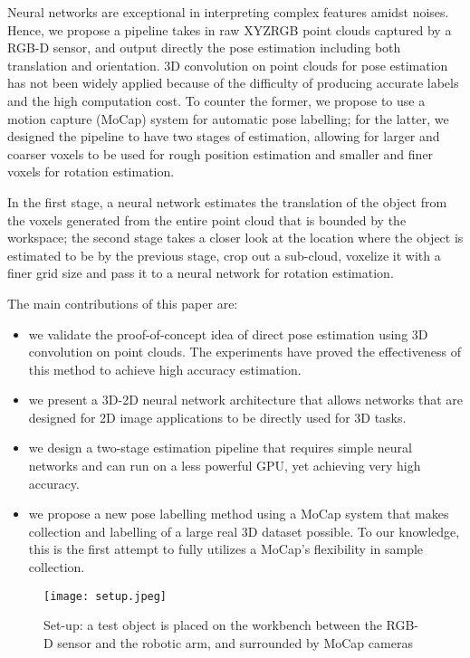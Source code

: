 \documentclass[conference]{IEEEtran}
\begin{document}
Neural networks are exceptional in interpreting complex features amidst noises. Hence, we propose a pipeline takes in raw XYZRGB point clouds captured by a RGB-D sensor, and output directly the pose estimation including both translation and orientation. 3D convolution on point clouds for pose estimation has not been widely applied because of the difficulty of producing accurate labels and the high computation cost. To counter the former, we propose to use a motion capture (MoCap) system for automatic pose labelling; for the latter, we designed the pipeline to have two stages of estimation, allowing for larger and coarser voxels to be used for rough position estimation and smaller and finer voxels for rotation estimation.

In the first stage, a neural network estimates the translation of the object from the voxels generated from the entire point cloud that is bounded by the workspace; the second stage takes a closer look at the location where the object is estimated to be by the previous stage, crop out a sub-cloud, voxelize it with a finer grid size and pass it to a neural network for rotation estimation.

The main contributions of this paper are:
\begin{itemize}
	\item we validate the proof-of-concept idea of direct pose estimation using 3D convolution on point clouds. The experiments have proved the effectiveness of this method to achieve high accuracy estimation.
	\item we present a 3D-2D neural network architecture that allows networks that are designed for 2D image applications to be directly used for 3D tasks.
	\item we design a two-stage estimation pipeline that requires simple neural networks and can run on a less powerful GPU, yet achieving very high accuracy.
	\item we propose a new pose labelling method using a MoCap system that makes collection and labelling of a large real 3D dataset possible. To our knowledge, this is the first attempt to fully utilizes a MoCap's flexibility in sample collection.
\end{itemize}


\begin{figure}[t]
 \centerline{\texttt{[image: setup.jpeg]}}
 \caption{Set-up: a test object is placed on the workbench between the RGB-D sensor and the robotic arm, and surrounded by MoCap cameras}
 \label{fig_setup}
\end{figure}
\end{document}
